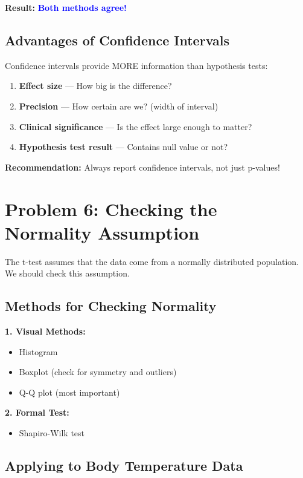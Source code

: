 \documentclass[11pt]{article}
\begin{document}
\textbf{Result:} \textcolor{blue}{\textbf{Both methods agree!}}

\subsection*{Advantages of Confidence Intervals}

Confidence intervals provide MORE information than hypothesis tests:
\begin{enumerate}
\item \textbf{Effect size} --- How big is the difference?
\item \textbf{Precision} --- How certain are we? (width of interval)
\item \textbf{Clinical significance} --- Is the effect large enough to matter?
\item \textbf{Hypothesis test result} --- Contains null value or not?
\end{enumerate}

\textbf{Recommendation:} Always report confidence intervals, not just p-values!

\vspace{12pt}

\section*{Problem 6: Checking the Normality Assumption}

The t-test assumes that the data come from a normally distributed population. We should check this assumption.

\subsection*{Methods for Checking Normality}

\textbf{1. Visual Methods:}
\begin{itemize}
\item Histogram
\item Boxplot (check for symmetry and outliers)
\item Q-Q plot (most important)
\end{itemize}

\textbf{2. Formal Test:}
\begin{itemize}
\item Shapiro-Wilk test
\end{itemize}

\subsection*{Applying to Body Temperature Data}
\end{document}
